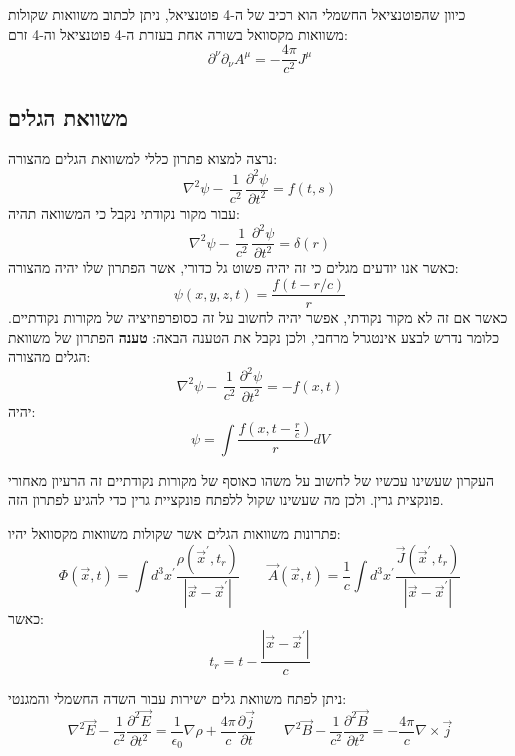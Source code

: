 \documentclass{tstextbook}
\begin{document}
\begin{remark}
כיוון שהפוטנציאל החשמלי הוא רכיב של ה-4 פוטנציאל, ניתן לכתוב משוואות שקולות משוואות מקסוואל בשורה אחת בעזרת ה-4 פוטנציאל וה-4 זרם:
$$\partial^{\nu}\partial_\nu A^{\mu}=-\frac{4\pi}{c^{2}}J^{\mu}$$

\end{remark}
\subsection{משוואת הגלים}

נרצה למצוא פתרון כללי למשוואת הגלים מהצורה:
$$\nabla^{2}\psi-\,{\frac{1}{c^{2}}}\,{\frac{\partial^{2}\psi}{\partial t^{2}}}=f(t,s)$$
עבור מקור נקודתי נקבל כי המשוואה תהיה:
$$\nabla^{2}\psi-\,{\frac{1}{c^{2}}}\,{\frac{\partial^{2}\psi}{\partial t^{2}}}=\delta(r)$$
כאשר אנו יודעים מגלים כי זה יהיה פשוט גל כדורי, אשר הפתרון שלו יהיה מהצורה:
$$\psi(x,y,z,t)={\frac{f(t-r/c)}{r}}$$
כאשר אם זה לא מקור נקודתי, אפשר יהיה לחשוב על זה כסופרפוזיציה של מקורות נקודתיים. כלומר נדרש לבצע אינטגרל מרחבי, 
ולכן נקבל את הטענה הבאה:
\textbf{טענה}
הפתרון של משוואת הגלים מהצורה:
$$\nabla^{2}\psi-\,{\frac{1}{c^{2}}}\,{\frac{\partial^{2}\psi}{\partial t^{2}}}=-f(x,t)$$
יהיה:
$$\psi=\int \frac{f\left(x, t-\frac{r}{c} \right)}{r}dV$$

\begin{remark}
העקרון שעשינו עכשיו של לחשוב על משהו כאוסף של מקורות נקודתיים זה הרעיון מאחורי פונקצית גרין. ולכן מה שעשינו שקול ללפתח פונקציית גרין כדי להגיע לפתרון הזה.

\end{remark}
\begin{corollary}
פתרונות משוואות הגלים אשר שקולות משוואות מקסוואל יהיו:
$$\Phi(\vec{x},t)=\int d^{3}x^{\prime}\frac{\rho(\vec{x}^{\prime},t_{r})}{|\vec{x}-\vec{x}^{\prime}|} \qquad \vec{A}(\vec{x},t)=\frac{1}{c}\int d^{3}x^{\prime}\frac{\vec{J}(\vec{x}^{\prime},t_{r})}{|\vec{x}-\vec{x}^{\prime}|} $$
כאשר:
$$t_{r}=t-{\frac{|{\vec{x}}-{\vec{x}}^{\prime}|}{c}}$$

\end{corollary}
\begin{proposition}
ניתן לפתח משוואת גלים ישירות עבור השדה החשמלי והמגנטי:
$$\nabla^{2}\vec{E}-{\frac{1}{c^{2}}}{\frac{\partial^{2}\vec{E}}{\partial t^{2}}}={\frac{1}{\epsilon_{0}}}\nabla\rho+\frac{4\pi}{c}{\frac{\partial\vec{j}}{\partial t}}\qquad \nabla^{2}\vec{B}-{\frac{1}{c^{2}}}{\frac{\partial^{2}\vec{B}}{\partial t^{2}}}=-\frac{4\pi}{c}\nabla\times\vec{j}$$

\end{proposition}
\end{document}
